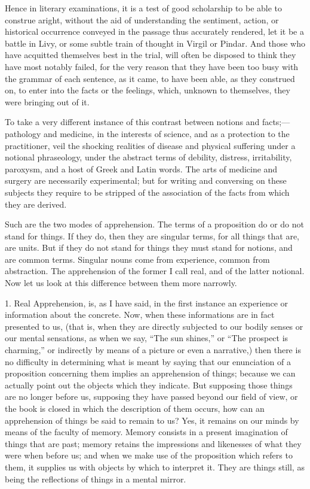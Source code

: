 Hence in literary examinations, it is a test of good scholarship to
be able to construe aright, without the aid of understanding the
sentiment, action, or historical occurrence conveyed in the passage
thus accurately rendered, let it be a battle in Livy, or some subtle
train of thought in Virgil or Pindar. And those who have acquitted
themselves best in the trial, will often be disposed to think they
have most notably failed, for the very reason that they have been too
busy with the grammar of each sentence, as it came, to have been able,
as they construed on, to enter into the facts or the feelings, which,
unknown to themselves, they were bringing out of it.

To take a very different instance of this contrast between notions
and facts;—pathology and medicine, in the interests of science, and
as a protection to the practitioner, veil the shocking realities of
disease and physical suffering under a notional phraseology, under the
abstract terms of debility, distress, irritability, paroxysm, and a
host of Greek and Latin words. The arts of medicine and surgery are
necessarily experimental; but for writing and conversing on these
subjects they require to be stripped of the association of the facts
from which they are derived.

Such are the two modes of apprehension. The terms of a proposition
do or do not stand for things. If they do, then they are singular
terms, for all things that are, are units. But if they do not stand
for things they must stand for notions, and are common terms. Singular
nouns come from experience, common from abstraction. The
apprehension of the former I call real, and of the latter notional.
Now let us look at this difference between them more narrowly.

1. Real Apprehension, is, as I have said, in the first instance an
experience or information about the concrete. Now, when these
informations are in fact presented to us, (that is, when they are
directly subjected to our bodily senses or our mental sensations, as
when we say, ``The sun shines,'' or ``The prospect is
charming,'' or indirectly by means of a picture or even a
narrative,) then there is no difficulty in determining what is meant
by saying that our enunciation of a proposition concerning them
implies an apprehension of things; because we can actually point out
the objects which they indicate. But supposing those things are no
longer before us, supposing they have passed beyond our field of view,
or the book is closed in which the description of them occurs, how can
an apprehension of things be said to remain to us? Yes, it remains on
our minds by means of the faculty of memory. Memory consists in a
present imagination of things that are past; memory retains the
impressions and likenesses of what they were when before us; and when
we make use of the proposition which refers to them, it supplies us
with objects by which to interpret it. They are things still, as being
the reflections of things in a mental mirror.

